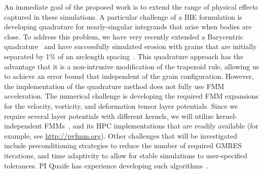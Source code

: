 \documentclass[11pt]{article}
\begin{document}
An immediate goal of the proposed work is to extend the range of physical effects captured in these simulations. A particular challenge of a BIE formulation is developing quadrature for nearly-singular integrands that arise when bodies are close. To address this problem, we have very recently extended a Barycentric quadrature~\cite{bar2014, bar-wu-vee2015} and have successfully simulated erosion with grains that are initially separated by 1\% of an arclength spacing~\cite{chi-moo-qua2019}. This quadrature approach has the advantage that it is a non-intrusive modification of the trapezoid rule, allowing us to achieve an error bound that independent of the grain configuration. However, the implementation of the quadrature method does not fully use FMM acceleration. The numerical challenge is developing the required FMM expansions for the velocity, vorticity, and deformation tensor layer potentials. Since we require several layer potentials with different kernels, we will utilize kernel-independent FMMs~\cite{yin-bir-zor2004, fon-dar2009}, and its HPC implementations that are readily available (for example, see \url{http://pvfmm.org}). Other challenges that will be investigated include preconditioning strategies to reduce the number of required GMRES iterations, and time adaptivity to allow for stable simulations to user-specified tolerances. PI Quaife has experience developing such algorithms~\cite{qua-bir2015b, qua-bir2016, qua-bir2015a, qua-cou-dar2018}.
\end{document}
